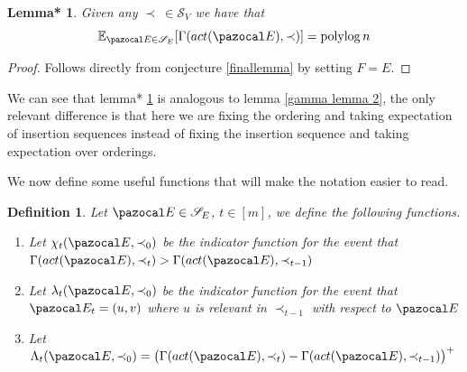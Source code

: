 \documentclass{report}
\newtheorem{lemma}[theorem]{Lemma}
\newtheorem{definition}[theorem]{Definition}
\newtheorem{lemma*}[theorem]{Lemma*}
\DeclareMathOperator*{\polylog}{polylog}
\begin{document}
\begin{lemma*}\label{gamma analog}
Given any $\prec \: \in \mathcal S_V$ we have that
\[ \mathbb E_{\pazocal E \in \mathcal S_E}[\Gamma(act(\pazocal E), \prec)] = \polylog n \]
\end{lemma*}

\begin{proof}
Follows directly from conjecture \ref{finallemma} by setting $F=E$.
\end{proof}

We can see that lemma* \ref{gamma analog} is analogous to lemma \ref{gamma lemma 2}, the only relevant difference is that here we are fixing the ordering and taking expectation of insertion sequences instead of fixing the insertion sequence and taking expectation over orderings.




We now define some useful functions that will make the notation easier to read.

\begin{definition}
Let $\pazocal E \in \mathcal S_E$, $t \in [m]$, we define the following functions.

\begin{enumerate}
    \item Let $\chi_t(\pazocal E, \prec_0)$ be the indicator function for the event that $\Gamma(act(\pazocal E), \prec_{t}) > \Gamma(act(\pazocal E), \prec_{t-1})$
    \item Let $\lambda_t(\pazocal E, \prec_0)$ be the indicator function for the event that $\pazocal E_{t}=(u,v)$ where $u$ is relevant in $\prec_{t-1}$ with respect to $\pazocal E$
    \item Let $\Lambda_t(\pazocal E, \prec_0) = \big(\Gamma(act(\pazocal E), \prec_{t}) - \Gamma(act(\pazocal E), \prec_{t-1})\big)^+$
\end{enumerate}

\end{definition}
\end{document}
